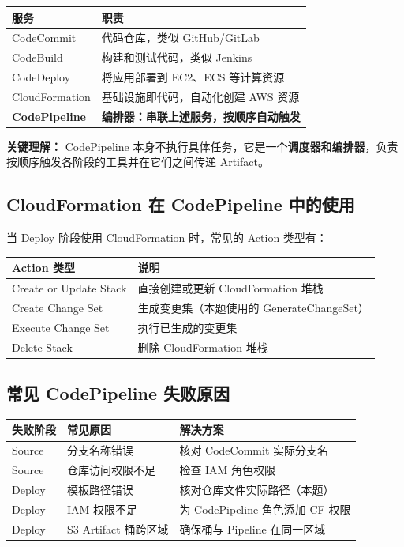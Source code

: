 \documentclass[12pt, a4paper]{article}
\begin{document}
\begin{tabularx}{\textwidth}{lX}
  \toprule
  \textbf{服务} & \textbf{职责} \\
  \midrule
  CodeCommit & 代码仓库，类似 GitHub/GitLab \\
  CodeBuild & 构建和测试代码，类似 Jenkins \\
  CodeDeploy & 将应用部署到 EC2、ECS 等计算资源 \\
  CloudFormation & 基础设施即代码，自动化创建 AWS 资源 \\
  \textbf{CodePipeline} & \textbf{编排器：串联上述服务，按顺序自动触发} \\
  \bottomrule
\end{tabularx}

\begin{notebox}
\textbf{关键理解：} CodePipeline 本身不执行具体任务，它是一个\textbf{调度器和编排器}，负责按顺序触发各阶段的工具并在它们之间传递 Artifact。
\end{notebox}

\subsection{CloudFormation 在 CodePipeline 中的使用}

当 Deploy 阶段使用 CloudFormation 时，常见的 Action 类型有：

\begin{tabularx}{\textwidth}{lX}
  \toprule
  \textbf{Action 类型} & \textbf{说明} \\
  \midrule
  Create or Update Stack & 直接创建或更新 CloudFormation 堆栈 \\
  Create Change Set & 生成变更集（本题使用的 GenerateChangeSet） \\
  Execute Change Set & 执行已生成的变更集 \\
  Delete Stack & 删除 CloudFormation 堆栈 \\
  \bottomrule
\end{tabularx}

\subsection{常见 CodePipeline 失败原因}

\begin{tabularx}{\textwidth}{lXX}
  \toprule
  \textbf{失败阶段} & \textbf{常见原因} & \textbf{解决方案} \\
  \midrule
  Source & 分支名称错误 & 核对 CodeCommit 实际分支名 \\
  Source & 仓库访问权限不足 & 检查 IAM 角色权限 \\
  Deploy & 模板路径错误 & 核对仓库文件实际路径（本题） \\
  Deploy & IAM 权限不足 & 为 CodePipeline 角色添加 CF 权限 \\
  Deploy & S3 Artifact 桶跨区域 & 确保桶与 Pipeline 在同一区域 \\
  \bottomrule
\end{tabularx}
\end{document}
